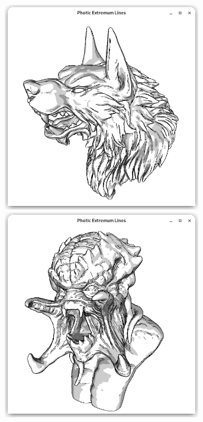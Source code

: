 \documentclass[9pt,fleqn,twoside,twocolumn]{stdglobal}
\begin{document}
\begin{figure}
\begin{subfigure}[t]{0.19\textwidth}
        \includegraphics[width=0.95\textwidth,trim={15px 15 15 50},clip]{images/results/werewolf-contours-pel-toon.png}
        \includegraphics[width=0.95\textwidth,trim={15px 15 15 50},clip]{images/results/predator-contours-pel-toon.png}

\end{subfigure}
\end{figure}
\end{document}
